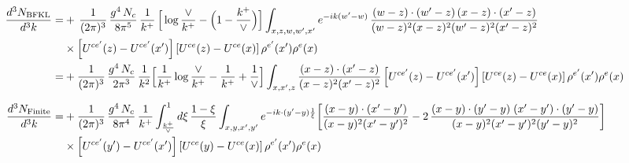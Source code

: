 \documentclass[9pt]{article}
\numberwithin{equation}{section}
\begin{document}
\begin{align}
\frac{d^{3}N_{\rm BFKL}}{d^{3}k}= &    +\,\frac{1}{(2\pi)^{3}}\,\frac{g^{4}\,N_{c}}{8\pi^{5}}\,\frac{1}{k^{+}}\,\Big[\log\frac{\vee}{k^{+}}-\Big(1-\frac{k^{+}}{\vee}\Big)\Big]\int_{x,z,w,w',x'}e^{-ik(w'-w)}\,\frac{(w-z)\cdot (w'-z)\,(x-z)\cdot (x'-z)}{(w-z)^{2}(x-z)^{2}(w'-z)^{2}(x'-z)^{2}}\notag\\
&\times\left[U^{ce'}(z) - U^{ce'}(x')\right]\left[U^{ce}(z) - U^{ce}(x)\right]\rho^{e'}(x') \rho^{e}(x)\notag \\
= & +\frac{1}{(2\pi)^{3}}\,\frac{g^{4}\,N_{c}}{2\pi^{3}}\,\frac{1}{k^{2}}\Big[\frac{1}{k^{+}}\log\frac{\vee}{k^{+}}-\frac{1}{k^{+}}+\frac{1}{\vee}\Big]\int_{x,x',z}\frac{(x-z)\cdot(x'-z)}{(x-z)^{2}(x'-z)^{2}}\left[U^{ce'}(z) - U^{ce'}(x')\right]\left[U^{ce}(z) - U^{ce}(x)\right]\rho^{e'}(x')\rho^{e}(x)\\[6pt]
\frac{d^{3}N_{\rm Finite}}{d^{3}k}= &  +\frac{1}{(2\pi)^{3}}\,\frac{g^{4}\,N_{c}}{8\pi^{4}}\,\frac{1}{k^{+}}\int_{\frac{k^{+}}{\vee}}^{1}d\xi\,\frac{1-\xi}{\xi}\int_{x,y,x',y'}e^{-ik\cdot(y'-y)\frac{1}{\xi}}\bigg[\frac{(x-y)\cdot(x'-y')}{(x-y)^{2}(x'-y')^{2}}-2\,\frac{(x-y)\cdot(y'-y)\;(x'-y')\cdot(y'-y)}{(x-y)^{2}(x'-y')^{2}(y'-y)^{2}}\bigg]\notag\\
&\times\left[U^{ce'}(y') - U^{ce'}(x')\right]\left[U^{ce}(y) - U^{ce}(x)\right]\rho^{e'}(x')\rho^{e}(x)
\end{align}
\end{document}

